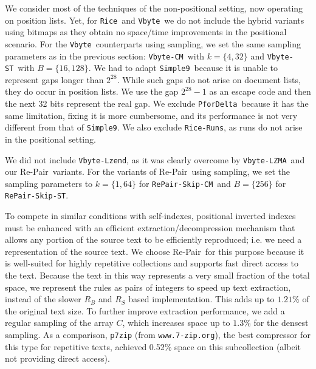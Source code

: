 \documentclass[review]{elsarticle}
\newcommand{\repair}{Re-Pair}
\newcommand{\vbyte}{\texttt{Vbyte}}
\newcommand{\vbyteB}{\texttt{VbyteB}}
\newcommand{\rice}{\texttt{Rice}}
\newcommand{\simplen}{\texttt{Simple9}}
\newcommand{\pfordelta}{\texttt{PforDelta}}
\newcommand{\riceRuns}{\texttt{Rice-Runs}}
\newcommand{\vbyteCM}{\texttt{Vbyte-CM}}
\newcommand{\vbyteCMB}{\texttt{Vbyte-CMB}}
\newcommand{\vbyteST}{\texttt{Vbyte-ST}}
\newcommand{\vbyteSTB}{\texttt{Vbyte-STB}}
\newcommand{\repairSkipCM}{\texttt{RePair-Skip-CM}}
\newcommand{\repairSkipST}{\texttt{RePair-Skip-ST}}
\newcommand{\vbyteLZMA}{\texttt{Vbyte-LZMA}}
\newcommand{\vbyteLzend}{\texttt{Vbyte-Lzend}}
\begin{document}
We consider most of the techniques of the non-positional setting, now
operating on position lists. Yet, for \rice\ and \vbyte\ we do not include the hybrid variants using bitmaps as they obtain no space/time improvements in the positional scenario. For the \vbyte\ counterparts using sampling, we set the same sampling parameters as in the previous section: \vbyteCM\ with $k=\{4,32\}$ and \vbyteST\ with $B=\{16,128\}$.
We had to adapt \simplen\ because it is unable
to represent gaps longer than $2^{28}$. While such gaps do not arise on
document lists, they do occur in position lists. We use the gap $2^{28}-1$
as an escape code and then the next 32 bits represent the real gap. We
exclude \pfordelta\ because it has the same limitation, fixing it is more
cumbersome, and its performance is not very different from that of \simplen.
We also exclude \riceRuns, as runs do not
arise in the positional setting.
%

We did not include \vbyteLzend, as it was clearly overcome by \vbyteLZMA\ and our \repair\ variants.
For the variants of \repair\ using sampling, we set the sampling parameters to $k=\{1,64\}$ for \repairSkipCM\ and $B=\{256\}$ for \repairSkipST.

To compete in similar conditions with self-indexes, positional inverted indexes
must be enhanced with an efficient extraction/decompression mechanism that allows any portion
of the source text to be efficiently reproduced; i.e. we need a representation of the source text. We choose \repair\ for this purpose because 
it is well-suited for highly repetitive collections and supports fast direct access 
to the text. Because the text in this way represents a very small fraction 
of the total space, we  represent the rules as pairs of integers to speed up text 
extraction, instead of the slower $R_B$ and $R_S$ based implementation. This adds up to 
$1.21\%$ of the original text size. To further improve extraction performance, we add a regular 
sampling of the array $C$, which increases space up to $1.3\%$ for the densest sampling. As 
a comparison, {\tt p7zip} (from {\tt www.7-zip.org}), the best compressor for this type 
for repetitive texts, achieved 0.52\% space on this subcollection (albeit not providing 
direct access).
\end{document}
